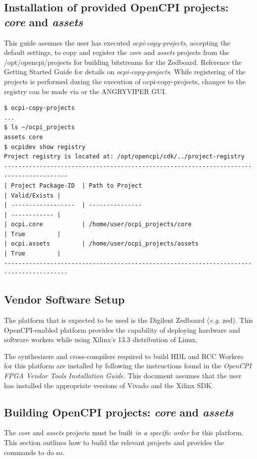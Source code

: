 \begin{flushleft}
\subsection{Installation of provided OpenCPI projects: \textit{core} and \textit{assets}}
This guide  assumes the user has executed \textit{ocpi-copy-projects}, accepting the default settings, to copy and register the \textit{core} and \textit{assets} projects from the /opt/opencpi/projects for building bitstreams for the Zedboard. Reference the Getting Started Guide for details on \textit{ocpi-copy-projects}.  While registering of the projects is performed during the execution of ocpi-copy-projects, changes to the registry can be made via  or the ANGRYVIPER GUI.\medskip

\begin{verbatim}
$ ocpi-copy-projects
...
$ ls ~/ocpi_projects
assets core
$ ocpidev show registry
Project registry is located at: /opt/opencpi/cdk/../project-registry
----------------------------------------------------------------------------------------
| Project Package-ID  | Path to Project                                 | Valid/Exists |
| ------------------  | ---------------                                 | ------------ |
| ocpi.core           | /home/user/ocpi_projects/core                   | True         |
| ocpi.assets         | /home/user/ocpi_projects/assets                 | True         |
----------------------------------------------------------------------------------------
\end{verbatim}

\subsection{Vendor Software Setup}
The platform that is expected to be used is the Digilent Zedboard (\textit{e.g.} zed). This OpenCPI-enabled platform provides the capability of deploying hardware and software workers while using Xilinx's 13.3 distribution of Linux.\\ \bigskip

The synthesizers and cross-compilers required to build HDL and RCC Workers for this platform are installed by following the instructions found in the \textit{OpenCPI FPGA Vendor Tools Installation Guide}. This document assumes that the user has installed the appropriate versions of Vivado and the Xilinx SDK.\\ \bigskip

\subsection{Building OpenCPI projects: \textit{core} and \textit{assets} }
\label{sec:Building OpenCPI projects}
The \textit{core} and \textit{assets} projects must be built \textit{in a specific order} for this platform. This section outlines how to build the relevant projects and provides the commands to do so.\medskip


\end{flushleft}
